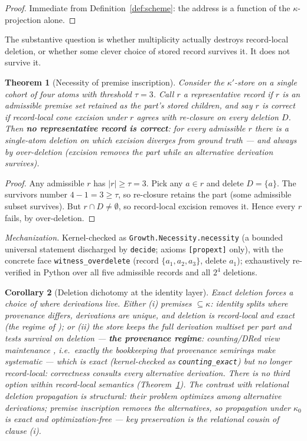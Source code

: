 \documentclass[10pt]{article}
\newtheorem{theorem}{Theorem}
\newtheorem{corollary}[theorem]{Corollary}
\newcommand{\sub}{\subseteq}
\newcommand{\kz}{\kappa_0}
\newcommand{\kp}{\kappa'}
\begin{document}
\begin{proof}
Immediate from Definition~\ref{def:scheme}: the address is a function of the $\kappa$-projection alone. \end{proof}

The substantive question is whether multiplicity actually destroys record-local deletion, or whether some clever choice of stored record survives it. It does not survive it.

\begin{theorem}[Necessity of premise inscription]\label{thm:necessity}
Consider the $\kp$-store on a single cohort of four atoms with threshold $\tau = 3$. Call $r$ a \emph{representative record} if $r$ is an admissible premise set retained as the part's stored children, and say $r$ is \emph{correct} if record-local cone excision under $r$ agrees with re-closure on every deletion $D$. Then \textbf{no representative record is correct}: for every admissible $r$ there is a single-atom deletion on which excision diverges from ground truth --- and always by \emph{over-deletion} (excision removes the part while an alternative derivation survives).
\end{theorem}

\begin{proof}
Any admissible $r$ has $|r| \ge \tau = 3$. Pick any $a \in r$ and delete $D = \{a\}$. The survivors number $4 - 1 = 3 \ge \tau$, so re-closure retains the part (some admissible subset survives). But $r \cap D \neq \emptyset$, so record-local excision removes it. Hence every $r$ fails, by over-deletion.
\end{proof}

\noindent\emph{Mechanization.} Kernel-checked as \texttt{Growth.Necessity.necessity} (a bounded universal statement discharged by \texttt{decide}; axioms \texttt{[propext]} only), with the concrete face \texttt{witness\_overdelete} (record $\{a_1,a_2,a_3\}$, delete $a_1$); exhaustively re-verified in Python over all five admissible records and all $2^4$ deletions.

\begin{corollary}[Deletion dichotomy at the identity layer]\label{cor:dichotomy}
Exact deletion forces a choice of where derivations live. Either \emph{(i)} premises $\sub \kappa$: identity splits where provenance differs, derivations are unique, and deletion is record-local and exact (the regime of \cite{deletion}); or \emph{(ii)} the store keeps the full derivation multiset per part and tests survival on deletion --- \textbf{the provenance regime}: counting/DRed view maintenance \cite{GuptaMS93}, i.e.\ exactly the bookkeeping that provenance semirings make systematic \cite{GKT07} --- which is exact (kernel-checked as \texttt{counting\_exact}) but no longer record-local: correctness consults every alternative derivation. There is no third option within record-local semantics (Theorem~\ref{thm:necessity}). The contrast with relational deletion propagation \cite{BKT02,KVW12} is structural: their problem optimizes among alternative derivations; premise inscription removes the alternatives, so propagation under $\kz$ is exact and optimization-free --- key preservation \cite{BKT02} is the relational cousin of clause (i).
\end{corollary}
\end{document}
